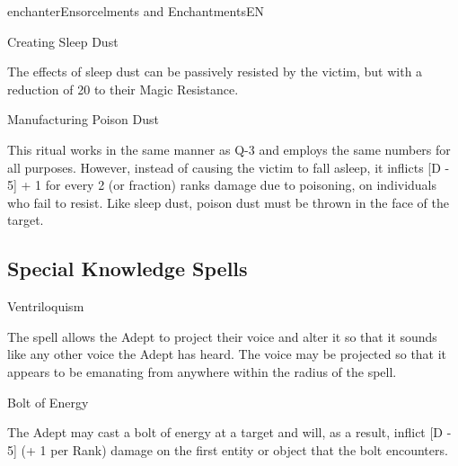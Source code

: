 \begin{college}[1.1]{enchanter}{Ensorcelments and Enchantments}{EN}
\begin{ritual}[Q-3]{Creating Sleep Dust}
\begin{effects}
The effects of sleep dust can be passively resisted by the victim, but
with a reduction of 20 to their Magic Resistance.
\end{effects}
\end{ritual}

\begin{ritual}[Q-4]{Manufacturing Poison Dust}

\begin{effects}
This ritual works in the same manner as Q-3 and employs the same
numbers for all purposes. However, instead of causing the victim to
fall asleep, it inflicts [D - 5] + 1 for every 2 (or fraction) ranks
damage due to poisoning, on individuals who fail to resist.  Like
sleep dust, poison dust must be thrown in the face of the target.
\end{effects}
\end{ritual}


\subsection{Special Knowledge Spells}

\begin{spell}[S-1]{Ventriloquism}

\begin{effects}
The spell allows the Adept to project their voice and alter it so that
it sounds like any other voice the Adept has heard. The voice may be
projected so that it appears to be emanating from anywhere within the
radius of the spell.
\end{effects}
\end{spell}

\begin{spell}[S-2]{Bolt of Energy}

\begin{effects}
The Adept may cast a bolt of energy at a target and will, as a result,
inflict [D - 5] (+ 1 per Rank) damage on the first entity or object
that the bolt encounters.

\end{effects}
\end{spell}


\end{college}
